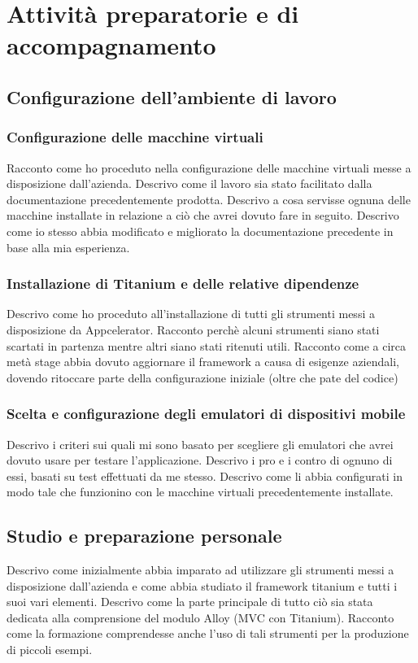 	\section{Attività preparatorie e di accompagnamento}
		\subsection{Configurazione dell'ambiente di lavoro}
			\subsubsection{Configurazione delle macchine virtuali}
				Racconto come ho proceduto nella configurazione delle macchine virtuali messe a disposizione dall'azienda. Descrivo
				come il lavoro sia stato facilitato dalla documentazione precedentemente prodotta. Descrivo a cosa servisse ognuna
				delle macchine installate in relazione a ciò che avrei dovuto fare in seguito. Descrivo come io stesso abbia
				modificato e migliorato la documentazione precedente in base alla mia esperienza.
			\subsubsection{Installazione di Titanium e delle relative dipendenze}
				Descrivo come ho proceduto all'installazione di tutti gli strumenti messi a disposizione da Appcelerator. Racconto
				perchè alcuni strumenti siano stati scartati in partenza mentre altri siano stati ritenuti utili. Racconto come a
				circa metà stage abbia dovuto aggiornare il framework a causa di esigenze aziendali, dovendo ritoccare parte della
				configurazione iniziale (oltre che pate del codice)
			\subsubsection{Scelta e configurazione degli emulatori di dispositivi mobile}
				Descrivo i criteri sui quali mi sono basato per scegliere gli emulatori che avrei dovuto usare per testare
				l'applicazione. Descrivo i pro e i contro di ognuno di essi, basati su test effettuati da me stesso. Descrivo come
				li abbia configurati in modo tale che funzionino con le macchine virtuali precedentemente installate.
		\subsection{Studio e preparazione personale}
			Descrivo come inizialmente abbia imparato ad utilizzare gli strumenti messi a disposizione dall'azienda e come abbia studiato
			il framework titanium e tutti i suoi vari elementi. Descrivo come la parte principale di tutto ciò sia stata dedicata alla
			comprensione del modulo Alloy (MVC con Titanium). Racconto come la formazione comprendesse anche l'uso di tali
			strumenti per la produzione di piccoli esempi.
